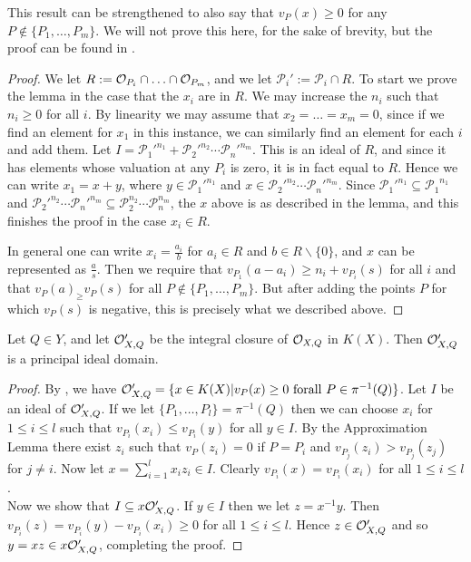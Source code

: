 \begin{rem}
This result can be strengthened to also say that $v_P(x) \geq 0$ for any $P\notin \{P_1,\ldots ,P_m\}$.
We will not prove this here, for the sake of brevity, but the proof can be found in \cite[Ch. 1, \S 3]{localfields}.
\end{rem}
\begin{proof}
We let $R:= {\cal O}_{P_i} \cap \ldots \cap {\cal O}_{P_m}$, and we let $\mathcal{P}_i' := \mathcal{P}_i \cap R$.
To start we prove the lemma in the case that the $x_i$ are in $R$.
 We may increase the $n_i$ such that $n_i\geq 0$ for all $i$.
 By linearity we may assume that $x_2 = \ldots = x_m = 0$, since if we find an element for $x_1$ in this instance, we can similarly find an element for each $i$ and add them.
Let $I = {\mathcal{P}_1'}^{n_1} + {\mathcal{P}_2'}^{n_2}\cdots {\mathcal{P}_n'}^{n_m}$.
This is an ideal of $R$, and since it has elements whose valuation at any $P_i$ is zero, it is in fact equal to $R$.
Hence we can write $x_1 = x + y$, where $y \in {\mathcal{P}_1'}^{n_1}$ and $x\in {\mathcal{P}_2'}^{n_2}\cdots {\mathcal{P}_n'}^{n_m}$.
Since ${\mathcal{P}_1'}^{n_1} \subseteq {\mathcal{P}_1}^{n_1}$ and ${\mathcal{P}_2'}^{n_2}\cdots {\mathcal{P}_n'}^{n_m} \subseteq \mathcal{P}_2^{n_2}\cdots \mathcal{P}_n^{n_m}$, the $x$ above is as described in the lemma, and this finishes the proof in the case $x_i \in R$.

 
 In general one can write $x_i = \frac{a_i}{b}$ for $a_i\in R$ and $b\in R\backslash \{0\}$, and $x$ can be represented as $\frac{a}{s}$.
 Then we require that $v_{P_1}(a-a_i) \geq n_i + v_{P_i}(s)$ for all $i$ and that $v_P(a)_ \geq v_P(s)$ for all $P\notin \{P_1,\ldots ,P_m\}$.
 But after adding the points $P$ for which $v_P(s)$ is negative, this is precisely what we described above.
\end{proof}

\begin{lem}\label{pidlemma}
 Let $Q\in Y$, and let ${\cal O}_{X,Q}'$ be the integral closure of ${\cal O}_{X,Q}$ in $K(X)$.
 Then ${\cal O}_{X,Q}'$ is a principal ideal domain.
\end{lem}
\begin{proof}
 By \cite[Cor. III.3.5]{stichtenoth}, we have ${\cal O}_{X,Q}' = \{x\in K(X)|v_P(x) \geq 0 \ {\rm for all} \ P\in \pi^{-1}(Q)\}$.
 Let $I$ be an ideal of ${\cal O}_{X,Q}'$.
 If we let $\{P_1,\ldots, P_l\} = \pi^{-1}(Q)$ then we can choose $x_i$ for $1\leq i \leq l$ such that $v_{P_i}(x_i) \leq v_{P_i}(y)$ for all $y\in I$.
 By the Approximation Lemma there exist $z_i$ such that $v_P (z_i) = 0$ if $P=P_i$ and $v_{P_j}(z_i) > v_{P_j}(z_j)$ for $j\neq i$.
 Now let $x = \sum_{i=1}^l x_iz_i \in I$.
 Clearly $v_{P_i}(x) = v_{P_i}(x_i)$ for all $1\leq i\leq l$.\\
 Now we show that $I \subseteq x{\cal O}_{X,Q}'$.
 If $y\in I$ then we let $z = x^{-1}y$.
 Then $v_{P_i}(z) = v_{P_i}(y) - v_{P_i}(x_i) \geq 0$ for all $1\leq i\leq l$.
Hence $z\in {\cal O}_{X,Q}'$ and so $y = xz \in x{\cal O}_{X,Q}'$, completing the proof.
\end{proof}



